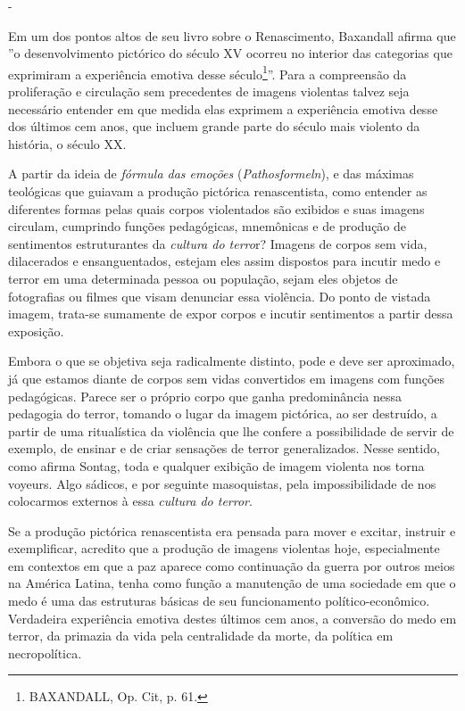 -

Em um dos pontos altos de seu livro sobre o Renascimento, Baxandall
afirma que ''o desenvolvimento pictórico do século XV ocorreu no
interior das categorias que exprimiram a experiência emotiva desse
século\footnote{BAXANDALL, Op. Cit, p. 61.}''. Para a compreensão da
proliferação e circulação sem precedentes de imagens violentas talvez
seja necessário entender em que medida elas exprimem a experiência
emotiva desse dos últimos cem anos, que incluem grande parte do século
mais violento da história, o século XX.

A partir da ideia de \emph{fórmula das emoções} (\emph{Pathosformeln}),
e das máximas teológicas que guiavam a produção pictórica renascentista,
como entender as diferentes formas pelas quais corpos violentados são
exibidos e suas imagens circulam, cumprindo funções pedagógicas,
mnemônicas e de produção de sentimentos estruturantes da \emph{cultura
do terro}r? Imagens de corpos sem vida, dilacerados e ensanguentados,
estejam eles assim dispostos para incutir medo e terror em uma
determinada pessoa ou população, sejam eles objetos de fotografias ou
filmes que visam denunciar essa violência. Do ponto de vistada imagem,
trata-se sumamente de expor corpos e incutir sentimentos a partir dessa
exposição.

Embora o que se objetiva seja radicalmente distinto, pode e deve ser
aproximado, já que estamos diante de corpos sem vidas convertidos em
imagens com funções pedagógicas. Parece ser o próprio corpo que ganha
predominância nessa pedagogia do terror, tomando o lugar da imagem
pictórica, ao ser destruído, a partir de uma ritualística da violência
que lhe confere a possibilidade de servir de exemplo, de ensinar e de
criar sensações de terror generalizados. Nesse sentido, como afirma
Sontag, toda e qualquer exibição de imagem violenta nos torna voyeurs.
Algo sádicos, e por seguinte masoquistas, pela impossibilidade de nos
colocarmos externos à essa \emph{cultura do terror}.

Se a produção pictórica renascentista era pensada para mover e excitar,
instruir e exemplificar, acredito que a produção de imagens violentas
hoje, especialmente em contextos em que a paz aparece como continuação
da guerra por outros meios na América Latina, tenha como função a
manutenção de uma sociedade em que o medo é uma das estruturas básicas
de seu funcionamento político-econômico. Verdadeira experiência emotiva
destes últimos cem anos, a conversão do medo em terror, da primazia da
vida pela centralidade da morte, da política em necropolítica.

